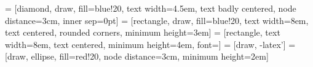 \usepackage{tikz}
\usetikzlibrary{shapes.geometric, arrows}
 = [diamond, draw, fill=blue!20, 
    text width=4.5em, text badly centered, node distance=3cm, inner sep=0pt]
 = [rectangle, draw, fill=blue!20, 
    text width=8em, text centered, rounded corners, minimum height=3em]
 = [rectangle, text width=8em, text centered, minimum height=4em, font=\small]
 = [draw, -latex']
 = [draw, ellipse, fill=red!20, node distance=3cm, minimum height=2em]

\newenvironment{flowchart}{%
	\begin{tikzpicture}[node distance = 2cm, auto]
}{\end{tikzpicture}}


